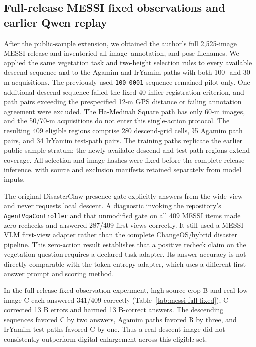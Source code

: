 \subsection{Full-release MESSI fixed observations and earlier Qwen replay}
\label{sec:messi-full}
After the public-sample extension, we obtained the author's full 2,525-image MESSI release and inventoried all image, annotation, and pose filenames. We applied the same vegetation task and two-height selection rules to every available descend sequence and to the Agamim and IrYamim paths with both 100- and 30-m acquisitions. The previously used \texttt{100\_0001} sequence remained pilot-only. One additional descend sequence failed the fixed 40-inlier registration criterion, and path pairs exceeding the prespecified 12-m GPS distance or failing annotation agreement were excluded. The Ha-Medinah Square path has only 60-m images, and the 50/70-m acquisitions do not enter this single-action protocol. The resulting 409 eligible regions comprise 280 descend-grid cells, 95 Agamim path pairs, and 34 IrYamim test-path pairs. The training paths replicate the earlier public-sample stratum; the newly available descend and test-path regions extend coverage. All selection and image hashes were fixed before the complete-release inference, with source and exclusion manifests retained separately from model inputs.

The original DisasterClaw presence gate explicitly answers from the wide view and never requests local descent. A diagnostic invoking the repository's \texttt{AgentVqaController} and that unmodified gate on all 409 MESSI items made zero rechecks and answered 287/409 first views correctly. It still used a MESSI VLM first-view adapter rather than the complete ChangeOS/hybrid disaster pipeline. This zero-action result establishes that a positive recheck claim on the vegetation question requires a declared task adapter. Its answer accuracy is not directly comparable with the token-entropy adapter, which uses a different first-answer prompt and scoring method.

In the full-release fixed-observation experiment, high-source crop B and real low-image C each answered 341/409 correctly (Table~\ref{tab:messi-full-fixed}); C corrected 13 B errors and harmed 13 B-correct answers. The descending sequences favored C by two answers, Agamim paths favored B by three, and IrYamim test paths favored C by one. Thus a real descent image did not consistently outperform digital enlargement across this eligible set.

